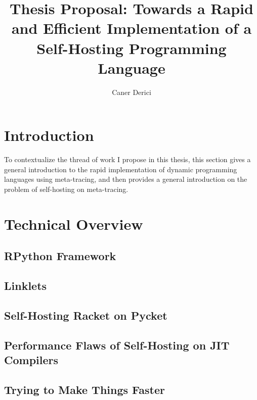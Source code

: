 \documentclass[9pt]{extarticle}
\title{Thesis Proposal: Towards a Rapid and Efficient Implementation
  of a Self-Hosting Programming Language}
\author{Caner Derici}
\begin{document}


\maketitle

\begin{abstract}
\end{abstract}

\section{Introduction}

To contextualize the thread of work I propose in this thesis, this
section gives a general introduction to the rapid implementation of
dynamic programming languages using meta-tracing, and then provides a
general introduction on the problem of self-hosting on meta-tracing.



\section{Technical Overview}

%

%

%

\subsection{RPython Framework}

\subsection{Linklets}

\subsection{Self-Hosting Racket on Pycket}

\subsection{Performance Flaws of Self-Hosting on JIT Compilers}

\subsection{Trying to Make Things Faster}
\end{document}
